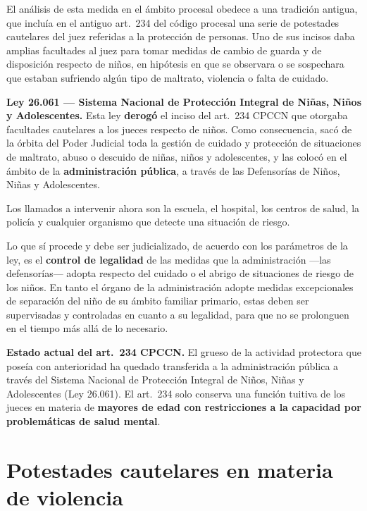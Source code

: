 \documentclass[12pt,oneside]{book}
\begin{document}
El análisis de esta medida en el ámbito procesal obedece a una tradición antigua, que incluía en el antiguo art.\ 234 del código procesal una serie de potestades cautelares del juez referidas a la protección de personas. Uno de sus incisos daba amplias facultades al juez para tomar medidas de cambio de guarda y de disposición respecto de niños, en hipótesis en que se observara o se sospechara que estaban sufriendo algún tipo de maltrato, violencia o falta de cuidado.

\begin{important}
\textbf{Ley 26.061 --- Sistema Nacional de Protección Integral de Niñas, Niños y Adolescentes.} Esta ley \textbf{derogó} el inciso del art.\ 234 CPCCN que otorgaba facultades cautelares a los jueces respecto de niños. Como consecuencia, sacó de la órbita del Poder Judicial toda la gestión de cuidado y protección de situaciones de maltrato, abuso o descuido de niñas, niños y adolescentes, y las colocó en el ámbito de la \textbf{administración pública}, a través de las Defensorías de Niños, Niñas y Adolescentes.

Los llamados a intervenir ahora son la escuela, el hospital, los centros de salud, la policía y cualquier organismo que detecte una situación de riesgo.
\end{important}

Lo que sí procede y debe ser judicializado, de acuerdo con los parámetros de la ley, es el \textbf{control de legalidad} de las medidas que la administración ---las defensorías--- adopta respecto del cuidado o el abrigo de situaciones de riesgo de los niños. En tanto el órgano de la administración adopte medidas excepcionales de separación del niño de su ámbito familiar primario, estas deben ser supervisadas y controladas en cuanto a su legalidad, para que no se prolonguen en el tiempo más allá de lo necesario.

\textbf{Estado actual del art.\ 234 CPCCN.} El grueso de la actividad protectora que poseía con anterioridad ha quedado transferida a la administración pública a través del Sistema Nacional de Protección Integral de Niños, Niñas y Adolescentes (Ley 26.061). El art.\ 234 solo conserva una función tuitiva de los jueces en materia de \textbf{mayores de edad con restricciones a la capacidad por problemáticas de salud mental}.

\section{Potestades cautelares en materia de violencia}
\end{document}
